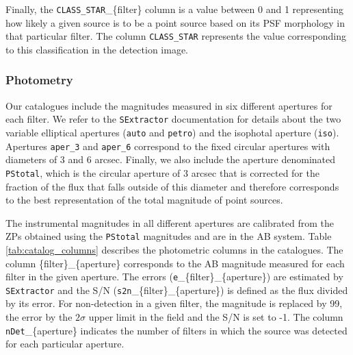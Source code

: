 \documentclass[fleqn,usenatbib]{mnras}
\begin{document}
Finally, the \texttt{CLASS\_STAR}\_\{filter\} column is a value between 0 and 1 representing how likely a given source is to be a point source based on its PSF morphology in that particular filter. The column \texttt{CLASS\_STAR} represents the value corresponding to this classification in the detection image.


\subsubsection{Photometry}

Our catalogues include the magnitudes measured in six different apertures for each filter. We refer to the \texttt{SExtractor} documentation for details about the two variable elliptical apertures (\texttt{auto} and \texttt{petro}) and the isophotal aperture (\texttt{iso}). Apertures \texttt{aper\_3} and \texttt{aper\_6} correspond to the fixed circular apertures with diameters of 3 and 6 arcsec. Finally, we also include the aperture denominated \texttt{PStotal}, which is the circular aperture of 3 arcsec that is corrected for the fraction of the flux that falls outside of this diameter and therefore corresponds to the best representation of the total magnitude of point sources.

The instrumental magnitudes in all different apertures are calibrated from the ZPs obtained using the \texttt{PStotal} magnitudes and are in the AB system. Table \ref{tab:catalog_columns} describes the photometric columns in the catalogues. The column \{filter\}\_\{aperture\} corresponds to the AB magnitude measured for each filter in the given aperture. The errors (\texttt{e}\_\{filter\}\_\{aperture\}) are estimated by \texttt{SExtractor} and the S/N (\texttt{s2n}\_\{filter\}\_\{aperture\}) is defined as the flux divided by its error. For non-detection in a given filter, the magnitude is replaced by 99, the error by the $2\sigma$ upper limit in the field and the S/N is set to -1. The column \texttt{nDet}\_\{aperture\} indicates the number of filters in which the source was detected for each particular aperture. 
\end{document}

